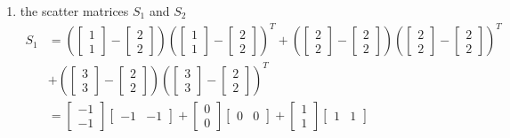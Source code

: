 \documentclass[12pt]{article}
\begin{document}
\begin{enumerate}
\item the scatter matrices $S_1$ and $S_2$
$$ \begin{aligned} S_1 &= \left( \begin{bmatrix} 1 \\ 1 \end{bmatrix} - \begin{bmatrix} 2 \\ 2 \end{bmatrix} \right)\left(\begin{bmatrix} 1 \\ 1 \end{bmatrix} - \begin{bmatrix} 2 \\ 2 \end{bmatrix}\right)^T + \left( \begin{bmatrix} 2 \\ 2 \end{bmatrix} - \begin{bmatrix} 2 \\ 2 \end{bmatrix} \right)\left(\begin{bmatrix} 2 \\ 2 \end{bmatrix} - \begin{bmatrix} 2 \\ 2 \end{bmatrix}\right)^T \\ &+ \left( \begin{bmatrix} 3 \\ 3 \end{bmatrix} - \begin{bmatrix} 2 \\ 2 \end{bmatrix} \right)\left(\begin{bmatrix} 3 \\ 3 \end{bmatrix} - \begin{bmatrix} 2 \\ 2 \end{bmatrix}\right)^T \\ &= \begin{bmatrix} -1 \\ -1 \end{bmatrix}\begin{bmatrix} -1 & -1 \end{bmatrix} + \begin{bmatrix} 0 \\ 0 \end{bmatrix}\begin{bmatrix} 0 & 0 \end{bmatrix} + \begin{bmatrix} 1 \\ 1 \end{bmatrix}\begin{bmatrix} 1 & 1 \end{bmatrix} 

\end{aligned}$$
\end{enumerate}
\end{document}
